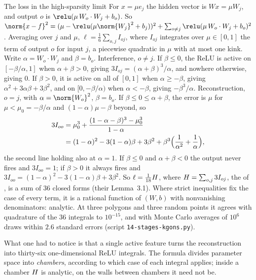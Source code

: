 \begin{refsection}
\begin{computation}{The loss in the high-sparsity limit}\label{comp:stages:loss}
\step For $x=\mu e_j$ the hidden vector is $Wx=\mu W_j$, and output $o$ is $\relu(\mu\,W_o\cdot W_j+b_o)$. So $\norm{x-f}^2=(\mu-\relu(\mu\norm{W_j}^2+b_j))^2+\sum_{o\ne j}\relu(\mu\,W_o\cdot W_j+b_o)^2$.
\step Averaging over $j$ and $\mu$, $\ell=\frac16\sum_{o,j}I_{oj}$, where $I_{oj}$ integrates over $\mu\in[0,1]$ the term of output $o$ for input $j$, a piecewise quadratic in $\mu$ with at most one kink. Write $\alpha=W_o\cdot W_j$ and $\beta=b_o$.
\step Interference, $o\neq j$. If $\beta\le0$, the ReLU is active on $[-\beta/\alpha,1]$ when $\alpha+\beta>0$, giving $3I_{oj}=(\alpha+\beta)^3/\alpha$, and nowhere otherwise, giving $0$. If $\beta>0$, it is active on all of $[0,1]$ when $\alpha\ge-\beta$, giving $\alpha^2+3\alpha\beta+3\beta^2$, and on $[0,-\beta/\alpha)$ when $\alpha<-\beta$, giving $-\beta^3/\alpha$.
\step Reconstruction, $o=j$, with $\alpha=\norm{W_o}^2$, $\beta=b_o$. If $\beta\le0\le\alpha+\beta$, the error is $\mu$ for $\mu<\mu_0=-\beta/\alpha$ and $(1-\alpha)\mu-\beta$ beyond, so
\[
\begin{aligned}
3I_{oo}&=\mu_0^3+\frac{(1-\alpha-\beta)^3-\mu_0^3}{1-\alpha}\\
&=(1-\alpha)^2-3(1-\alpha)\beta+3\beta^2+\beta^3\Bigl(\frac1{\alpha^2}+\frac1\alpha\Bigr),
\end{aligned}
\]
the second line holding also at $\alpha=1$. If $\beta\le0$ and $\alpha+\beta<0$ the output never fires and $3I_{oo}=1$; if $\beta>0$ it always fires and $3I_{oo}=(1-\alpha)^2-3(1-\alpha)\beta+3\beta^2$.
\step So $\ell=\frac1{18}H$, where $H=\sum_{o,j}3I_{oj}$, the  of \textcite{ChenEtAl2023}, is a sum of $36$ closed forms (their Lemma~3.1). Where strict inequalities fix the case of every term, it is a rational function of $(W,b)$ with nonvanishing denominators: analytic. At three polygons and three random points it agrees with quadrature of the $36$ integrals to $10^{-15}$, and with Monte Carlo averages of $10^6$ draws within $2.6$ standard errors (script \texttt{14-stages-kgons.py}).
\end{computation}

What one had to notice is that a single active feature turns the reconstruction into thirty-six one-dimensional ReLU integrals. The formula divides parameter space into \emph{chambers}, according to which case of each integral applies; inside a chamber $H$ is analytic, on the walls between chambers it need not be.


\end{refsection}
